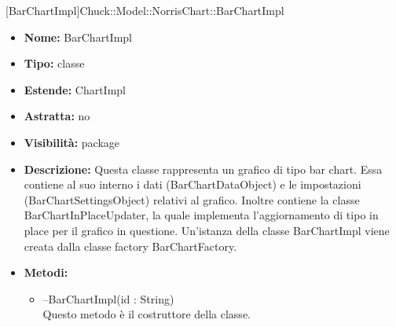 			
			[BarChartImpl]{Chuck::Model::NorrisChart::BarChartImpl}
			

	
			
			\begin{itemize}
			\item \textbf{Nome:} BarChartImpl
			\item \textbf{Tipo:} classe
			
		\item \textbf{Estende:}
		ChartImpl
		\item \textbf{Astratta:}
		no
			\item \textbf{Visibilità:} package
			\item \textbf{Descrizione:} Questa classe rappresenta un grafico di tipo bar chart. Essa contiene al suo interno i dati (BarChartDataObject) e le impostazioni (BarChartSettingsObject) relativi al grafico. Inoltre contiene la classe BarChartInPlaceUpdater, la quale implementa l'aggiornamento di tipo in place per il grafico in questione. Un'istanza della classe BarChartImpl viene creata dalla classe factory BarChartFactory.

			\item \textbf{Metodi:}
				\begin{itemize}
				\setlength{\itemsep}{5pt}
				
					\item[\ding{111}] {{--BarChartImpl(id : String)}} \\ [1mm] Questo metodo è il costruttore della classe.
				\end{itemize}
		
			\end{itemize}

